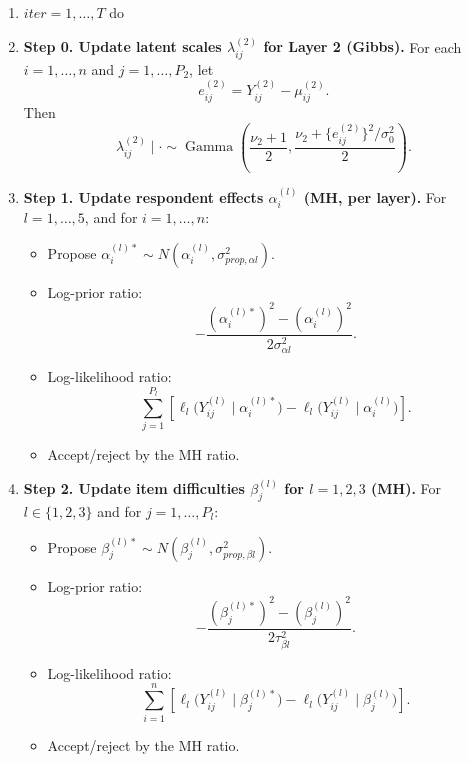 \documentclass[11pt]{article}
\begin{document}
\begin{enumerate}[leftmargin=1.8em]
    \item[for] $iter=1,\dots,T$ do

    \item \textbf{Step 0. Update latent scales $\lambda_{ij}^{(2)}$ for Layer 2 (Gibbs).}
    For each $i=1,\dots,n$ and $j=1,\dots,P_2$, let
    \[
    e_{ij}^{(2)} = Y_{ij}^{(2)} - \mu_{ij}^{(2)}.
    \]
    Then
    \[
    \lambda_{ij}^{(2)}\mid \cdot
    \sim
    \operatorname{Gamma}\left(
    \frac{\nu_2+1}{2},
    \frac{\nu_2 + \{e_{ij}^{(2)}\}^2/\sigma_0^2}{2}
    \right).
    \]

    \item \textbf{Step 1. Update respondent effects $\alpha_i^{(l)}$ (MH, per layer).}
    For $l=1,\dots,5$, and for $i=1,\dots,n$:
    \begin{itemize}[leftmargin=1.5em]
        \item Propose $\alpha_i^{(l)*}\sim N(\alpha_i^{(l)},\sigma_{prop,\alpha l}^2)$.
        \item Log-prior ratio:
        \[
        -\frac{(\alpha_i^{(l)*})^2-(\alpha_i^{(l)})^2}{2\sigma_{\alpha l}^2}.
        \]
        \item Log-likelihood ratio:
        \[
        \sum_{j=1}^{P_l}\left[\ell_l\bigl(Y_{ij}^{(l)}\mid \alpha_i^{(l)*}\bigr)-\ell_l\bigl(Y_{ij}^{(l)}\mid \alpha_i^{(l)}\bigr)\right].
        \]
        \item Accept/reject by the MH ratio.
    \end{itemize}

    \item \textbf{Step 2. Update item difficulties $\beta_j^{(l)}$ for $l=1,2,3$ (MH).}
    For $l\in\{1,2,3\}$ and for $j=1,\dots,P_l$:
    \begin{itemize}[leftmargin=1.5em]
        \item Propose $\beta_j^{(l)*}\sim N(\beta_j^{(l)},\sigma_{prop,\beta l}^2)$.
        \item Log-prior ratio:
        \[
        -\frac{(\beta_j^{(l)*})^2-(\beta_j^{(l)})^2}{2\tau_{\beta l}^2}.
        \]
        \item Log-likelihood ratio:
        \[
        \sum_{i=1}^{n}\left[\ell_l\bigl(Y_{ij}^{(l)}\mid \beta_j^{(l)*}\bigr)-\ell_l\bigl(Y_{ij}^{(l)}\mid \beta_j^{(l)}\bigr)\right].
        \]
        \item Accept/reject by the MH ratio.
    \end{itemize}


\end{enumerate}
\end{document}
